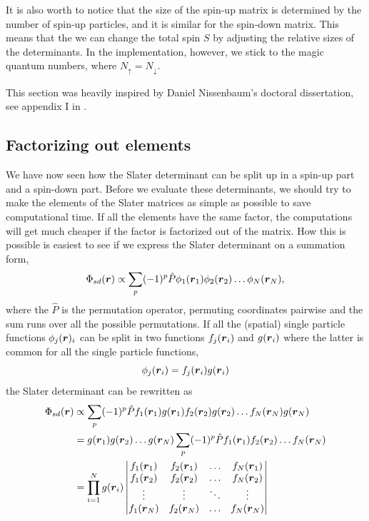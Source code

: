 It is also worth to notice that the size of the spin-up matrix is determined by the number of spin-up particles, and it is similar for the spin-down matrix. This means that the we can change the total spin $S$ by adjusting the relative sizes of the determinants. In the implementation, however, we stick to the magic quantum numbers, where $N_{\uparrow}=N_{\downarrow}$. 

This section was heavily inspired by Daniel Nissenbaum's doctoral dissertation, see appendix I in \cite{nissenbaum_stochastic_2008}.

\subsection{Factorizing out elements} \label{sec:factorizing}
We have now seen how the Slater determinant can be split up in a spin-up part and a spin-down part. Before we evaluate these determinants, we should try to make the elements of the Slater matrices as simple as possible to save computational time. If all the elements have the same factor, the computations will get much cheaper if the factor is factorized out of the matrix. How this is possible is easiest to see if we express the Slater determinant on a summation form,
\begin{equation}
\Phi_{sd}(\boldsymbol{{r}})\propto\sum_{p}(-1)^p\hat{P}\phi_1(\boldsymbol{{r}}_1)\phi_2(\boldsymbol{{r}}_2)\hdots\phi_N(\boldsymbol{{r}}_N),
\label{eq:slatersum}
\end{equation}
where the $\hat{P}$ is the permutation operator, permuting coordinates pairwise and the sum runs over all the possible permutations. If all the (spatial) single particle functions $\phi_j(\boldsymbol{{r}})_i$ can be split in two functions $f_j(\boldsymbol{{r}}_i)$ and $g(\boldsymbol{{r}}_i)$ where the latter is common for all the single particle functions,
\begin{equation}
\phi_j(\boldsymbol{{r}}_i)=f_j(\boldsymbol{{r}}_i)g(\boldsymbol{{r}}_i)
\end{equation}
the Slater determinant can be rewritten as
\begin{equation}
\begin{aligned}
\Phi_{sd}(\boldsymbol{{r}})&\propto\sum_{p}(-1)^p\hat{P}f_1(\boldsymbol{{r}}_1)g(\boldsymbol{{r}}_1)f_2(\boldsymbol{{r}}_2)g(\boldsymbol{{r}}_2)\hdots f_N(\boldsymbol{{r}}_N)g(\boldsymbol{{r}}_N)\\
&=g(\boldsymbol{{r}}_1)g(\boldsymbol{{r}}_2)\hdots g(\boldsymbol{{r}}_N)\sum_{p}(-1)^p\hat{P}f_1(\boldsymbol{{r}}_1)f_2(\boldsymbol{{r}}_2)\hdots f_N(\boldsymbol{{r}}_N)\\
&=\prod_{i=1}^Ng(\boldsymbol{{r}}_i)
\begin{vmatrix}
f_1(\boldsymbol{r}_1) & f_2(\boldsymbol{r}_1) & \hdots & f_N(\boldsymbol{r}_1)\\
f_1(\boldsymbol{r}_2) & f_2(\boldsymbol{r}_2) & \hdots & f_N(\boldsymbol{r}_2)\\
\vdots & \vdots & \ddots & \vdots \\
f_1(\boldsymbol{r}_N) & f_2(\boldsymbol{r}_N) & \hdots & f_N(\boldsymbol{r}_N)
\end{vmatrix}
\end{aligned}
\end{equation}
